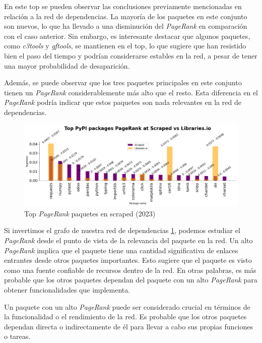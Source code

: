 En este top se pueden observar las conclusiones previamente mencionadas en relación a la red de
dependencias. La mayoría de los paquetes en este conjunto son nuevos, lo que ha llevado a una
disminución del \textit{PageRank} en comparación con el caso anterior. Sin embargo, es
interesante destacar que algunos paquetes, como \textit{c3tools} y
\textit{gftools},
se mantienen en el top, lo que sugiere que han resistido bien el paso del tiempo y podrían
considerarse estables en la red, a pesar de tener una mayor probabilidad de
desaparición.

Además, se puede observar que los tres paquetes principales en este conjunto tienen
un \textit{PageRank} considerablemente más alto que el resto. Esta diferencia en
el \textit{PageRank} podría indicar que estos paquetes son nada relevantes
en la red de dependencias.

\begin{figure}[ht!]
    \begin{center}
        \includegraphics[width=1\textwidth]{img/pypi/t20_pkg_pr_scr.png}
        \caption{Top \textit{PageRank} paquetes en scraped (2023)}
        \label{fig:Top PageRank paquetes en scraped}
    \end{center}
\end{figure}

Si invertimos el grafo de nuestra red de dependencias \ref{fig:Top PageRank paquetes en scraped}, podemos estudiar el \textit{PageRank}
desde el punto de vista de la relevancia del paquete en la red. Un alto \textit{PageRank}
implica que el paquete tiene una cantidad significativa de enlaces entrantes desde otros paquetes
importantes. Esto sugiere que el paquete es visto como una fuente confiable de recursos dentro de la red.
En otras palabras, es más probable que los otros paquetes dependan del paquete con un alto \textit{PageRank} para obtener
funcionalidades que implementa.

Un paquete con un alto \textit{PageRank} puede ser considerado crucial en términos de la funcionalidad
o el rendimiento de la red. Es probable que los otros paquetes dependan directa o indirectamente de
él para llevar a cabo sus propias funciones o tareas.

